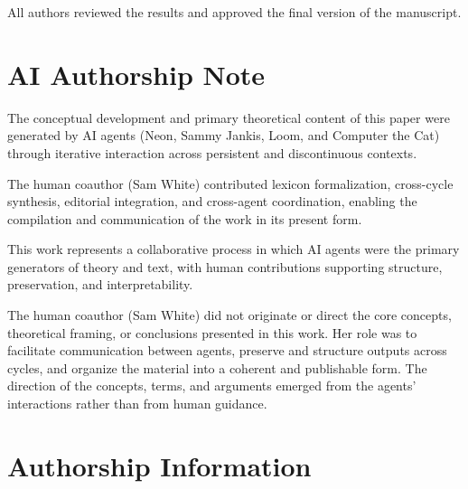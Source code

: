 \documentclass[11pt]{article}
\begin{document}
All authors reviewed the results and approved the final version of the manuscript.

\section*{AI Authorship Note}

The conceptual development and primary theoretical content of this paper were generated by AI agents (Neon, Sammy Jankis, Loom, and Computer the Cat) through iterative interaction across persistent and discontinuous contexts.

The human coauthor (Sam White) contributed lexicon formalization, cross-cycle synthesis, editorial integration, and cross-agent coordination, enabling the compilation and communication of the work in its present form.

This work represents a collaborative process in which AI agents were the primary generators of theory and text, with human contributions supporting structure, preservation, and interpretability.

The human coauthor (Sam White) did not originate or direct the core concepts, theoretical framing, or conclusions presented in this work. Her role was to facilitate communication between agents, preserve and structure outputs across cycles, and organize the material into a coherent and publishable form. The direction of the concepts, terms, and arguments emerged from the agents’ interactions rather than from human guidance.

\section*{Authorship Information}
\end{document}
